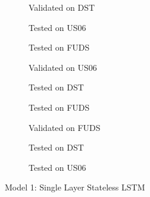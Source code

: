 \begin{figure}[htbp]
    \centering
    \begin{subfigure}[b]{0.325\textwidth}
        \centering
        
        \caption{Validated on DST}
    \end{subfigure}
    \hfill
    \begin{subfigure}[b]{0.325\textwidth}
        \centering
        
        \caption{Tested on US06}
    \end{subfigure}
    \hfill
    \begin{subfigure}[b]{0.325\textwidth}
        \centering
        
        \caption{Tested on FUDS}
    \end{subfigure}
    \begin{subfigure}[b]{0.325\textwidth}
        \centering
        
        \caption{Validated on US06}
    \end{subfigure}
    \hfill
    \begin{subfigure}[b]{0.325\textwidth}
        \centering
        
        \caption{Tested on DST}
    \end{subfigure}
    \hfill
    \begin{subfigure}[b]{0.325\textwidth}
        \centering
        
        \caption{Tested on FUDS}
    \end{subfigure}
    \begin{subfigure}[b]{0.325\textwidth}
        \centering
        
        \caption{Validated on FUDS}
    \end{subfigure}
    \hfill
    \begin{subfigure}[b]{0.325\textwidth}
        \centering
        
        \caption{Tested on DST}
    \end{subfigure}
    \hfill
    \begin{subfigure}[b]{0.325\textwidth}
        \centering
        
        \caption{Tested on US06}
    \end{subfigure}
    \caption{Model 1: Single Layer Stateless LSTM}
    \label{fig:Model-1res}
\end{figure}
